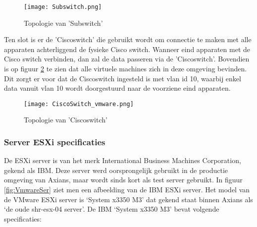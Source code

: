 \begin{figure}[H]
	\centering
	\texttt{[image: Subswitch.png]}
	\caption{Topologie van 'Sub\textunderscore switch'}
	\label{fig:subswitch}
\end{figure}

\newline
Ten slot is er de 'Cisco\textunderscore switch' die gebruikt wordt om connectie te maken met alle apparaten achterliggend de fysieke Cisco switch. Wanneer eind apparaten met de Cisco switch verbinden, dan zal de data passeren via de 'Cisco\textunderscore switch'. Bovendien is op figuur \ref{fig:Ciscoswitch} te zien dat alle virtuele machines zich in deze omgeving bevinden. Dit zorgt er voor dat de Cisco\textunderscore switch ingesteld is met vlan id 10, waarbij enkel data vanuit vlan 10 wordt doorgestuurd naar de voorziene eind apparaten.

\begin{figure}[H]
	\centering
	\texttt{[image: CiscoSwitch\_vmware.png]}
	\caption{Topologie van 'Cisco\textunderscore switch'}
	\label{fig:Ciscoswitch}
\end{figure}

\subsubsection{Server ESXi specificaties}
De ESXi server is van het merk International Business Machines Corporation, gekend als IBM. Deze server werd oorsprongelijk gebruikt in de productie omgeving van Axians, maar wordt sinds kort als test server gebruikt. In figuur \ref{fig:VmwareSer} ziet men een afbeelding van de IBM ESXi server.
\newline
\newline
Het model van de VMware ESXi server is ‘System x3350 M3’ dat gekend staat binnen Axians als ‘de oude shr-esx-04 server’. De IBM ‘System x3350 M3’ bevat volgende specificaties:


